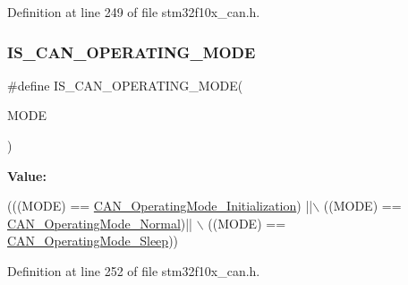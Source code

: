 Definition at line 249 of file stm32f10x\+\_\+can.\+h.

\mbox{\label{group___c_a_n___operating___mode_ga377f1598db9b0248ba83fa6e5a75db75}} 
\subsubsection{\texorpdfstring{I\+S\+\_\+\+C\+A\+N\+\_\+\+O\+P\+E\+R\+A\+T\+I\+N\+G\+\_\+\+M\+O\+DE}{IS\_CAN\_OPERATING\_MODE}}
{\footnotesize\ttfamily \#define I\+S\+\_\+\+C\+A\+N\+\_\+\+O\+P\+E\+R\+A\+T\+I\+N\+G\+\_\+\+M\+O\+DE(\begin{DoxyParamCaption}\item[{}]{M\+O\+DE }\end{DoxyParamCaption})}

{\bfseries Value\+:}
\begin{DoxyCode}
(((MODE) == \hyperlink{group___c_a_n___operating___mode_gace8a4b5c164aba6f473d6254ad1e8a36}{CAN\_OperatingMode\_Initialization}) ||\(\backslash\)
                                    ((MODE) == \hyperlink{group___c_a_n___operating___mode_ga663ecffaa60d1a201a035dfa45325848}{CAN\_OperatingMode\_Normal})|| \(\backslash\)
                                                                        ((MODE) == 
      \hyperlink{group___c_a_n___operating___mode_ga173b85d2baaa6249d966b8073e3ad8ca}{CAN\_OperatingMode\_Sleep}))
\end{DoxyCode}


Definition at line 252 of file stm32f10x\+\_\+can.\+h.

